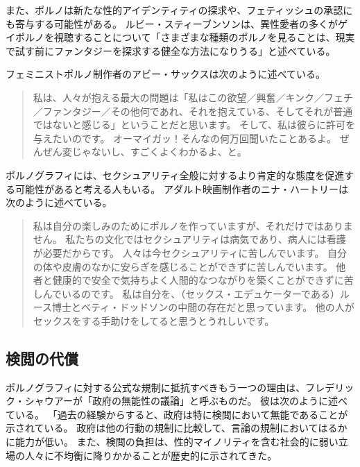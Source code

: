 \documentclass[paper=a4,book,openany]{jlreq} \usepackage{mystyle}
\begin{document}
また、ポルノは新たな性的アイデンティティの探求や、フェティッシュの承認にも寄与する可能性がある。
ルビー・スティーブンソンは、異性愛者の多くがゲイポルノを視聴することについて「さまざまな種類のポルノを見ることは、現実で試す前にファンタジーを探求する健全な方法になりうる」と述べている\citep{bloodworth18:_this_is_why_straig_men}。

フェミニストポルノ制作者のアビー・サックスは次のように述べている。

\begin{quote}
私は、人々が抱える最大の問題は「私はこの欲望／興奮／キンク／フェチ／ファンタジー／その他何であれ、それを抱えている、そしてそれが普通ではないと感じる」ということだと思います。
そして、私は彼らに許可を与えたいのです。
オーマイガッ！そんなの何万回聞いたことあるよ。
ぜんぜん変じゃないし、すごくよくわかるよ、と。
\citep{sachs12:_inter_femin_pornog}
\end{quote}

ポルノグラフィには、セクシュアリティ全般に対するより肯定的な態度を促進する可能性があると考える人もいる。
アダルト映画制作者のニナ・ハートリーは次のように述べている。

\begin{quote}
私は自分の楽しみのためにポルノを作っていますが、それだけではありません。
私たちの文化ではセクシュアリティは病気であり、病人には看護が必要だからです。
人々は今セクシュアリティに苦しんでいます。
自分の体や皮膚のなかに安らぎを感じることができずに苦しんでいます。
他者と健康的で安全で気持ちよく人間的なつながりを築くことができずに苦しんでいるのです。
私は自分を、（セックス・エデュケーターである）ルース博士とベティ・ドッドソンの中間の存在だと思っています。
他の人がセックスをする手助けをしてると思うとうれしいです。
\citep{wischhover15:_why_im_still_doing_porn}
\end{quote}

\subsection{検閲の代償}

ポルノグラフィに対する公式な規制に抵抗すべきもう一つの理由は、フレデリック・シャウアーが「政府の無能性の議論」と呼ぶものだ。
彼は次のように述べている。
「過去の経験からすると、政府は特に検閲において無能であることが示されている。
政府は他の行動の規制に比較して、言論の規制においてはるかに能力が低い\citep[p.82]{schauer82:_free_speec}。
また、検閲の負担は、性的マイノリティを含む社会的に弱い立場の人々に不均衡に降りかかることが歴史的に示されてきた。
\end{document}
